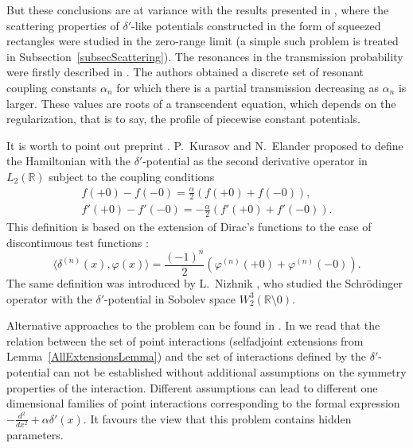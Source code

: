 \documentclass[11pt,english]{amsart}
\begin{document}
But these conclusions are at variance with the results presented in \cite{ChristianZolotarIermak03,ToyamaNogami,
Zolotaryuk06, Zolotaryuk08},  where the scattering properties of  $\delta'$-like potentials constructed
in the form of squeezed rectangles were studied in the zero-range limit
(a simple such problem is treated in  Subsection~\ref{subsecScattering}).
The resonances in the transmission probability were firstly described  in \cite{ChristianZolotarIermak03}.
The authors  obtained a discrete set of resonant coupling constants $\alpha_n$
for which there is a partial transmission decreasing as $\alpha_n$ is larger. These values are roots of a
transcendent equation, which depends on the regularization, that is to say, the profile of  piecewise constant potentials.

It is worth to  point out preprint \cite{KurElaMSI93}.
P.~Kurasov and N.~Elander proposed to define the Hamiltonian with the $\delta'$-potential as the second
derivative operator in $L_2(\mathbb R)$ subject to the coupling conditions
\begin{equation}\label{KurasovDefn}
\begin{gathered}
f(+0)-f(-0)=\frac{\alpha}{2}(f(+0)+f(-0)), \\[5pt]
f'(+0)-f'(-0)=-\frac{\alpha}{2}(f'(+0)+f'(-0)).
\end{gathered}
\end{equation}
This definition is based on the extension of Dirac's functions
to the case of discontinuous test functions \cite{KurasovJMAA96}:
$$\langle\delta^{(n)}(x),\varphi(x)
\rangle=\frac{(-1)^{n}}{2}(\varphi^{(n)}(+0)+\varphi^{(n)}(-0)).$$
The same definition was introduced by L.~Nizhnik \cite{NizhFAA2006}, who studied the Schr\"{o}dinger operator with
the $\delta'$-potential in Sobolev space $W_2^3(\mathbb R\setminus 0)$.

Alternative approaches to the problem can be found in \cite{GriffithsJPhA1993, GesHolJPA, KiselevJMAA1997}.
In \cite[p.~339]{AlbeverioKurasov} we read that the relation between the set of point interactions (selfadjoint extensions from Lemma~\ref{AllExtensionsLemma}) and the set of interactions defined by the $\delta'$-potential can not be established  without additional assumptions on the symmetry properties of the interaction.
Different assumptions can lead to different one dimensional families of point interactions corresponding to the formal expression $-\frac{d^2}{dx^2}+\alpha\delta'(x)$.
It favours the view that this problem contains  hidden parameters.
\end{document}

